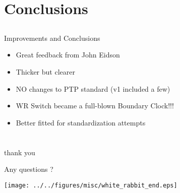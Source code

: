 \documentclass[compress,red]{beamer}
\begin{document}
\section{Conclusions}
\subsection{}
\begin{frame}{Improvements and Conclusions}

\begin{itemize}
  \item Great feedback from John Eidson
  \item Thicker but clearer
  \item NO changes to PTP standard (v1 included a few)
  \item WR Switch became a full-blown Boundary Clock!!!
  \item Better fitted for standardization attempts
\end{itemize}

\end{frame}
\section{}
\begin{frame}{thank you}

    \begin{center}
    Any questions ?
    \end{center}

    
    \begin{center}
    \texttt{[image: ../../figures/misc/white\_rabbit\_end.eps]}
    \end{center}

\end{frame}
\end{document}
